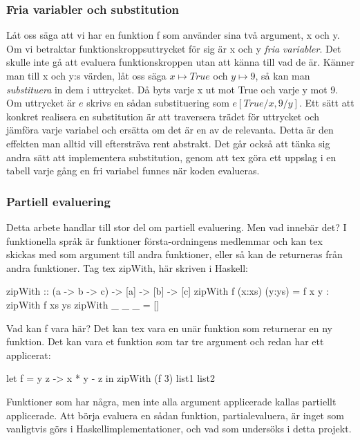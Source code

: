 \documentclass[Rapport]{subfiles}
\begin{document}
\subsubsection{Fria variabler och substitution}
Låt oss säga att vi har en funktion f som använder sina två 
argument, x och y. Om vi betraktar funktionskroppsuttrycket för sig är x och y 
\emph{fria variabler}. Det skulle inte gå att evaluera funktionskroppen utan
att känna till vad de är. Känner man till x och y:s värden, låt oss säga
$x \mapsto True$ och $y \mapsto 9$, så kan man \emph{substituera} in dem i uttrycket. Då byts varje
x ut mot True och varje y mot 9. Om uttrycket är $e$ skrivs en sådan substituering som $e[True/x, 9/y]$. 
    Ett sätt att konkret realisera en substitution är att traversera trädet
för uttrycket och jämföra varje variabel och ersätta om det är en av de
relevanta. Detta är den effekten man alltid vill eftersträva rent abstrakt.
Det går också att tänka sig andra sätt att implementera substitution, genom
att tex göra ett uppslag i en tabell varje gång en fri variabel funnes när
koden evalueras. 

\subsubsection{Partiell evaluering}
Detta arbete handlar till stor del om partiell evaluering. Men vad innebär det?
I funktionella språk är funktioner första-ordningens medlemmar och kan tex
skickas med som argument till andra funktioner, eller så kan de returneras från
andra funktioner. Tag tex zipWith, här skriven i Haskell:
\begin{codeEx}
zipWith :: (a -> b -> c) -> [a] -> [b] -> [c]
zipWith f (x:xs) (y:ys) = f x y : zipWith f xs ys
zipWith _ _      _      = []
\end{codeEx}
Vad kan f vara här? Det kan tex vara en unär funktion som returnerar en ny
funktion. Det kan vara et funktion som tar tre argument och redan har ett
applicerat:
\begin{codeEx}
let f = \x y z -> x * y - z
in  zipWith (f 3) list1 list2
\end{codeEx}
Funktioner som har några, men inte alla argument applicerade kallas 
partiellt applicerade. Att börja evaluera en sådan funktion, partialevaluera,
är inget som vanligtvis görs i Haskellimplementationer,
och vad som undersöks i detta projekt. 
\end{document}
